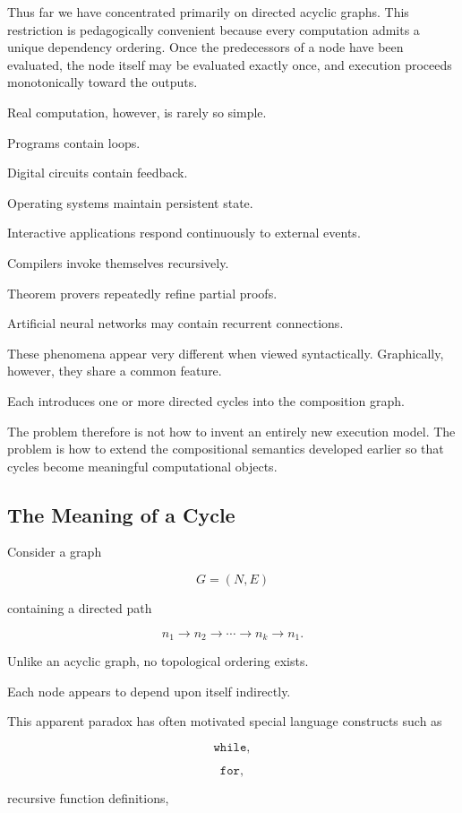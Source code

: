 \documentclass[12pt,oneside]{article}
\begin{document}
Thus far we have concentrated primarily on directed acyclic graphs. This restriction is pedagogically convenient because every computation admits a unique dependency ordering. Once the predecessors of a node have been evaluated, the node itself may be evaluated exactly once, and execution proceeds monotonically toward the outputs.

Real computation, however, is rarely so simple.

Programs contain loops.

Digital circuits contain feedback.

Operating systems maintain persistent state.

Interactive applications respond continuously to external events.

Compilers invoke themselves recursively.

Theorem provers repeatedly refine partial proofs.

Artificial neural networks may contain recurrent connections.

These phenomena appear very different when viewed syntactically. Graphically, however, they share a common feature.

Each introduces one or more directed cycles into the composition graph.

The problem therefore is not how to invent an entirely new execution model. The problem is how to extend the compositional semantics developed earlier so that cycles become meaningful computational objects.

\subsection{The Meaning of a Cycle}

Consider a graph

\[
G=(N,E)
\]

containing a directed path

\[
n_1
\rightarrow
n_2
\rightarrow
\cdots
\rightarrow
n_k
\rightarrow
n_1.
\]

Unlike an acyclic graph, no topological ordering exists.

Each node appears to depend upon itself indirectly.

This apparent paradox has often motivated special language constructs such as

\[
\texttt{while},
\]

\[
\texttt{for},
\]

recursive function definitions,
\end{document}
